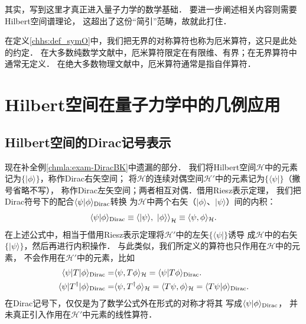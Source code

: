 其实，写到这里才真正进入量子力学的数学基础．
要进一步阐述相关内容则需要Hilbert空间谱理论，
这超出了这份“简引”范畴，故就此打住．


\begin{remark}
	在定义\ref{chhs:def_symO}中，我们把无界的对称算符也称为厄米算符，这只是此处的约定．
	在大多数纯数学文献中，厄米算符限定在有限维、有界；在无界算符中通常无定义．
	在绝大多数物理文献中，厄米算符通常是指自伴算符．
\end{remark}


\section{Hilbert空间在量子力学中的几例应用}

 

\subsection{Hilbert空间的Dirac记号表示}\label{chhs:sec_dirac}

现在补全例\ref{chmla:exam-DiracBK}中遗漏的部分．
我们将Hilbert空间$\mathcal{H}$中的元素记为$\{|\phi\rangle\}$，称作Dirac右矢空间；
将$\mathcal{H}$的连续对偶空间$\mathcal{H}'$中的元素记为$\{\langle \psi|\}$（撇号省略不写），
称作Dirac左矢空间；两者相互对偶．借用Riesz表示定理，
我们把Dirac符号下的{\kaishu 配合}$\langle \psi| \phi\rangle_{\rm Dirac}$转换
为$\mathcal{H}$中两个右矢（$|\phi\rangle$、$|\psi\rangle$）间的内积：
\begin{equation}
	\langle \psi| \phi\rangle_{\rm Dirac} \equiv
	\left < |\psi\rangle, \  |\phi\rangle \right>_{\mathcal{H}} \equiv
	\langle \psi, \phi\rangle_{\mathcal{H}}.
\end{equation}
在上述公式中，相当于借用Riesz表示定理将$\mathcal{H}'$中的左矢$\{\langle \psi|\}$诱导
成$\mathcal{H}$中的右矢$\{|\psi\rangle\}$，然后再进行内积操作．
与此类似，我们所定义的算符也只作用在$\mathcal{H}$中的元素，
不会作用在$\mathcal{H}'$中的元素，比如
\begin{align}
	\langle \psi| T |\phi\rangle_{\rm Dirac} = &
	\langle \psi, T \phi\rangle_{\mathcal{H}} =
	\langle \psi| T \phi\rangle_{\rm Dirac} . \\
	\langle \psi| T^\dagger |\phi\rangle_{\rm Dirac} = &
	\langle \psi, T^\dagger \phi\rangle_{\mathcal{H}} = 
	\langle T \psi,  \phi\rangle_{\mathcal{H}}=
	\langle T \psi|\phi\rangle_{\rm Dirac}.
\end{align}
在Dirac记号下，仅仅是为了数学公式外在形式的对称才将其
写成$\langle \psi| \phi\rangle_{\rm Dirac}$，
并未真正引入作用在$\mathcal{H}'$中元素的线性算符．


